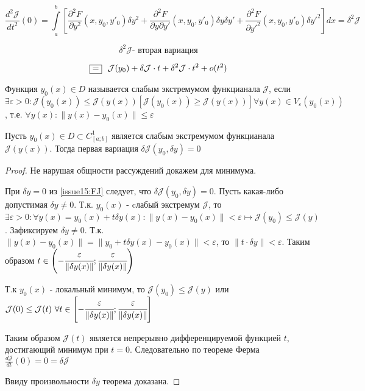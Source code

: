 \documentclass[a4paper, 12pt]{article}
\begin{document}
    \begin{equation} \label{issue15:SJ}
        \frac{d^2 \mathcal{J}}{dt^2}(0) = \int \limits_a^b \left[  \frac{\partial^2 F}{\partial y^2}(x, y_0, y'_0) \delta y^2 
        + \frac{\partial^2 F}{\partial y \partial {y'}} (x, y_0, y'_0) \delta y \delta {y'} + \frac{\partial^2 F}{\partial {y'}^2} (x, y_0, y'_0) \delta {y'}^2  \right] dx 
        = \delta^2 \mathcal{J}
    \end{equation}

    \[ \delta^2 \mathcal{J} \text{- вторая вариация} \]

    \[ \fbox{=}~~ \mathcal{J}(y_0) + \delta \mathcal{J}\cdot t + \delta^2 \mathcal{J} \cdot t^2 + o(t^2)\]

    \begin{definition}
        Функция $y_0(x) \in D$ называется слабым экстремумом функцианала $\mathcal{J}$, если $\exists \varepsilon > 0: \mathcal{J}(y_0(x)) \leq \mathcal{J}(y(x)) \left[ \mathcal{J}(y_0(x)) \geq \mathcal{J}(y(x)) \right] \forall y(x) \in V_{\varepsilon} (y_0(x))$, т.е. $\forall y(x): \| y(x) - y_0(x)\| \leq \varepsilon$ 
    \end{definition}

    \begin{theorem}
        Пусть $y_0(x) \in D \subset C^1_{[a;b]}$ является слабым экстремумом функцианала $\mathcal{J}(y(x))$. Тогда первая вариация $\delta \mathcal{J}(y_0, \delta y) = 0$ 
    \end{theorem}
    \begin{proof}
        Не нарушая общности рассуждений докажем для минимума.
        
        При $\delta y = 0$ из \eqref{issue15:FJ} следует, что $\delta \mathcal{J}(y_0, \delta y) = 0$. Пусть какая-либо допустимая $\delta y \neq 0$. Т.к. $y_0(x)$ - cлабый экстремум $\mathcal{J}$, то $\exists \varepsilon > 0: \forall y(x) = y_0(x) + t \delta y(x): \| y(x) - y_0(x) \| < \varepsilon \mapsto \mathcal{J}(y_0) \leq \mathcal{J}(y)$. 
        Зафиксируем $\delta y \neq 0$. Т.к. $\| y(x) - y_0(x) \| = \| y_0 + t \delta y(x) - y_0(x)\| < \varepsilon$, то $\| t \cdot \delta y \| < \varepsilon $. Таким образом $t \in \left( - \cfrac{\varepsilon}{\| \delta y(x)\|}; \cfrac{\varepsilon}{\| \delta y(x)\|}\right)$  
    
        Т.к $y_0(x)$ - локальный минимум, то $\mathcal{J}(y_0) \leq \mathcal{J}(y)$ или $\mathcal{J}(0) \leq \mathcal{J}(t)~\forall t \in \left[ - \cfrac{\varepsilon}{\| \delta y(x)\|}; \cfrac{\varepsilon}{\| \delta y(x)\|} \right]$ 

        Таким образом $\mathcal{J}(t)$ является непрерывно дифференцируемой функцией $t$, достигающий минимум при $t = 0$. Следовательно по теореме Ферма $\frac{d \mathcal{J}}{dt} (0) = 0 = \delta \mathcal{J}$
        
        Ввиду произвольности $\delta y$ теорема доказана. 
    \end{proof}
\end{document}
